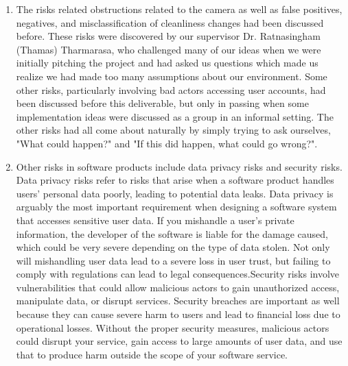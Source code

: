 \documentclass{article}
\begin{document}
\begin{enumerate}
    \item The risks related obstructions related to the camera as well as false positives, negatives, and misclassification of cleanliness changes had been discussed before. These risks were discovered by our supervisor Dr. Ratnasingham (Thamas) Tharmarasa, who challenged many of our ideas when we were initially pitching the project and had asked us questions which made us realize we had made too many assumptions about our environment. Some other risks, particularly involving bad actors accessing user accounts, had been discussed before this deliverable, but only in passing when some implementation ideas were discussed as a group in an informal setting. The other risks had all come about naturally by simply trying to ask ourselves, "What could happen?" and "If this did happen, what could go wrong?".
    
    \item Other risks in software products include data privacy risks and security risks. Data privacy risks refer to risks that arise when a software product handles users' personal data poorly, leading to potential data leaks. Data privacy is arguably the most important requirement when designing a software system that accesses sensitive user data. If you mishandle a user's private information, the developer of the software is liable for the damage caused, which could be very severe depending on the type of data stolen. Not only will mishandling user data lead to a severe loss in user trust, but failing to comply with regulations can lead to legal consequences.\newline Security risks involve vulnerabilities that could allow malicious actors to gain unauthorized access, manipulate data, or disrupt services. Security breaches are important as well because they can cause severe harm to users and lead to financial loss due to operational losses. Without the proper security measures, malicious actors could disrupt your service, gain access to large amounts of user data, and use that to produce harm outside the scope of your software service.
\end{enumerate}
\end{document}
